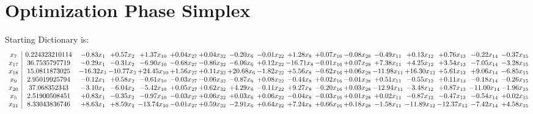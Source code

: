 \documentclass[9pt]{article}
\begin{document}
\section{Optimization Phase Simplex}
Starting Dictionary is:
\[\begin{array}{c| c c@{\hskip 2pt} c@{\hskip 2pt} c@{\hskip 2pt} c@{\hskip 2pt} c@{\hskip 2pt} c@{\hskip 2pt} c@{\hskip 2pt} c@{\hskip 2pt} c@{\hskip 2pt} c@{\hskip 2pt} c@{\hskip 2pt} c@{\hskip 2pt} c@{\hskip 2pt} c@{\hskip 2pt} c@{\hskip 2pt} }
 x_{7}   &  0.224323210114 & -0.83 x_{1} & +  0.57 x_{2} & +  1.37 x_{10} & +  0.04 x_{27} & +  0.04 x_{32} & -0.20 x_{6} & -0.01 x_{22} & +  1.28 x_{8} & +  0.07 x_{16} & -0.08 x_{28} & -0.49 x_{11} & +  0.13 x_{12} & +  0.76 x_{13} & -0.22 x_{14} & -0.37 x_{15}\\
 x_{17}   &  36.7535797719 & -0.29 x_{1} & -0.31 x_{2} & -6.90 x_{10} & -0.68 x_{27} & -0.86 x_{32} & -6.06 x_{6} & +  0.12 x_{22} & -16.71 x_{8} & -0.01 x_{16} & +  0.07 x_{28} & +  7.38 x_{11} & +  4.25 x_{12} & +  3.54 x_{13} & -7.05 x_{14} & -3.28 x_{15}\\
 x_{18}   &  15.0811873025 & -16.32 x_{1} & -10.77 x_{2} & + 24.45 x_{10} & +  1.56 x_{27} & +  0.11 x_{32} & + 20.68 x_{6} & -1.82 x_{22} & +  5.56 x_{8} & -0.62 x_{16} & +  0.06 x_{28} & -11.98 x_{11} & + 16.30 x_{12} & +  5.61 x_{13} & +  9.06 x_{14} & -6.85 x_{15}\\
 x_{9}   &  2.95019925794 & -0.12 x_{1} & +  0.58 x_{2} & -0.61 x_{10} & -0.03 x_{27} & -0.06 x_{32} & -0.87 x_{6} & +  0.08 x_{22} & -0.44 x_{8} & +  0.02 x_{16} & -0.01 x_{28} & +  0.51 x_{11} & -0.55 x_{12} & +  0.11 x_{13} & -0.18 x_{14} & -0.26 x_{15}\\
 x_{20}   &  37.068352343 & -3.10 x_{1} & -6.04 x_{2} & -5.42 x_{10} & +  0.05 x_{27} & +  0.62 x_{32} & +  4.29 x_{6} & -0.11 x_{22} & +  9.27 x_{8} & -0.20 x_{16} & +  0.03 x_{28} & -12.94 x_{11} & -3.48 x_{12} & +  0.87 x_{13} & -11.00 x_{14} & -1.96 x_{15}\\
 x_{5}   &  2.51900508451 & +  0.83 x_{1} & -0.35 x_{2} & -0.97 x_{10} & -0.03 x_{27} & +  0.06 x_{32} & +  0.03 x_{6} & +  0.06 x_{22} & -0.04 x_{8} & -0.03 x_{16} & +  0.01 x_{28} & +  0.02 x_{11} & -0.87 x_{12} & -0.47 x_{13} & -0.54 x_{14} & +  0.02 x_{15}\\
 x_{21}   &  8.33043836746 & +  8.63 x_{1} & +  8.59 x_{2} & -13.74 x_{10} & -0.01 x_{27} & +  0.59 x_{32} & -2.91 x_{6} & +  0.64 x_{22} & +  7.24 x_{8} & +  0.66 x_{16} & +  0.18 x_{28} & -1.58 x_{11} & -11.89 x_{12} & -12.37 x_{13} & -7.42 x_{14} & +  4.58 x_{15}\\

\end{array}\]
\end{document}
